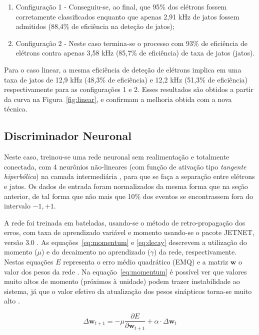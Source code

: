 \begin{enumerate}
\item Configuração 1 - Conseguiu-se, ao final, que 95\% dos elétrons fossem
corretamente classificados enquanto que apenas 2,91 kHz de jatos fossem
admitidos (88,4\% de eficiência na deteção de jatos);
\item Configuração 2 - Neste caso termina-se o processo com 93\% de eficiência
de elétrons contra apenas 3,58 kHz (85,7\% de eficiência) de taxa de jatos
(jatos).
\end{enumerate}

Para o caso linear, a mesma eficiência de deteção de elétrons implica em uma
taxa de jatos de 12,9 kHz (48,3\% de eficiência) e 12,2 kHz (51,3\% de
eficiência) respectivamente para as configurações 1 e 2. Esses resultados são
obtidos a partir da curva na Figura~\ref{fig:linear}, e confirmam a melhoria
obtida com a nova técnica.

\subsection{Discriminador Neuronal}

Neste caso, treinou-se uma rede neuronal sem realimentação e totalmente
conectada, com 4 neurônios não-lineares (com função de ativação tipo
\emph{tangente hiperbólica}) na camada intermediária \cite{haykin}, para que
se faça a separação entre elétrons e jatos. Os dados de entrada foram
normalizados da mesma forma que na seção anterior, de tal forma que não mais
que 10\% dos eventos se encontrassem fora do intervalo ${-1,+1}$.

A rede foi treinada em bateladas, usando-se o método de retro-propagação dos
erros, com taxa de aprendizado variável e momento \cite{haykin, hertz}
usando-se o pacote JETNET, versão 3.0 \cite{jetnet}. As
equações~\ref{eq:momentum} e \ref{eq:decay} descrevem a utilização do momento
($\mu$) e do decaimento no aprendizado ($\gamma$) da rede,
respectivamente. Nestas equações $E$ representa o erro médio quadrático (EMQ)
e a matriz $\boldsymbol{w}$ o valor dos pesos da rede \cite{jetnet}. Na
equação~\ref{eq:momentum} é possível ver que valores muito altos de momento
(próximos à unidade) podem trazer instabilidade ao sistema, já que o valor
efetivo da atualização dos pesos sinápticos torna-se muito alto \cite{hertz}.

\begin{equation}
\Delta \boldsymbol{w}_{t+1} = -\mu\frac{\partial E}{\partial \boldsymbol{w}_{t+1}} + \alpha\cdot\Delta \boldsymbol{w}_{t}
\label{eq:momentum}
\end{equation}

